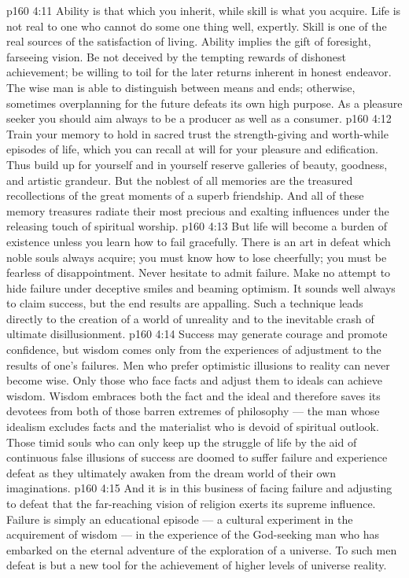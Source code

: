 \vs p160 4:11 Ability is that which you inherit, while skill is what you acquire. Life is not real to one who cannot do some one thing well, expertly. Skill is one of the real sources of the satisfaction of living. Ability implies the gift of foresight, farseeing vision. Be not deceived by the tempting rewards of dishonest achievement; be willing to toil for the later returns inherent in honest endeavor. The wise man is able to distinguish between means and ends; otherwise, sometimes overplanning for the future defeats its own high purpose. As a pleasure seeker you should aim always to be a producer as well as a consumer.
\vs p160 4:12 Train your memory to hold in sacred trust the strength\hyp{}giving and worth\hyp{}while episodes of life, which you can recall at will for your pleasure and edification. Thus build up for yourself and in yourself reserve galleries of beauty, goodness, and artistic grandeur. But the noblest of all memories are the treasured recollections of the great moments of a superb friendship. And all of these memory treasures radiate their most precious and exalting influences under the releasing touch of spiritual worship.
\vs p160 4:13 But life will become a burden of existence unless you learn how to fail gracefully. There is an art in defeat which noble souls always acquire; you must know how to lose cheerfully; you must be fearless of disappointment. Never hesitate to admit failure. Make no attempt to hide failure under deceptive smiles and beaming optimism. It sounds well always to claim success, but the end results are appalling. Such a technique leads directly to the creation of a world of unreality and to the inevitable crash of ultimate disillusionment.
\vs p160 4:14 Success may generate courage and promote confidence, but wisdom comes only from the experiences of adjustment to the results of one’s failures. Men who prefer optimistic illusions to reality can never become wise. Only those who face facts and adjust them to ideals can achieve wisdom. Wisdom embraces both the fact and the ideal and therefore saves its devotees from both of those barren extremes of philosophy --- the man whose idealism excludes facts and the materialist who is devoid of spiritual outlook. Those timid souls who can only keep up the struggle of life by the aid of continuous false illusions of success are doomed to suffer failure and experience defeat as they ultimately awaken from the dream world of their own imaginations.
\vs p160 4:15 And it is in this business of facing failure and adjusting to defeat that the far\hyp{}reaching vision of religion exerts its supreme influence. Failure is simply an educational episode --- a cultural experiment in the acquirement of wisdom --- in the experience of the God\hyp{}seeking man who has embarked on the eternal adventure of the exploration of a universe. To such men defeat is but a new tool for the achievement of higher levels of universe reality.

